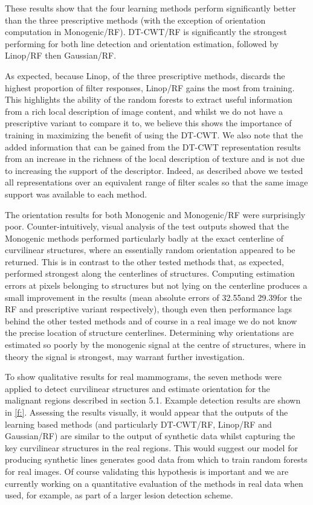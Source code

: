 These results show that the four learning methods perform significantly better than the three prescriptive methods (with the exception of orientation computation in Monogenic/RF). DT-CWT/RF is significantly the strongest performing for both line detection and orientation estimation, followed by Linop/RF then Gaussian/RF.

As expected, because Linop, of the three prescriptive methods, discards the highest proportion of filter responses, Linop/RF gains the most from training. This highlights the ability of the random forests to extract useful information from a rich local description of image content, and whilst we do not have a prescriptive variant to compare it to, we believe this shows the importance of training in maximizing the benefit of using the DT-CWT. We also note that the added information that can be gained from the DT-CWT representation results from an increase in the richness of the local description of texture and is not due to increasing the support of the descriptor. Indeed, as described above we tested all representations over an equivalent range of filter scales so that the same image support was available to each method.

The orientation results for both Monogenic and Monogenic/RF were surprisingly poor. Counter-intuitively, visual analysis of the test outputs showed that the Monogenic methods performed particularly badly at the exact centerline of curvilinear structures, where an essentially random orientation appeared to be returned. This is in contrast to the other tested methods that, as expected, performed strongest along the centerlines of structures. Computing estimation errors at pixels belonging to structures but not lying on the centerline produces a small improvement in the results (mean absolute errors of 32.55\deg and 29.39\deg for the RF and prescriptive variant respectively), though even then performance lags behind the other tested methods and of course in a real image we do not know the precise location of structure centerlines. Determining why orientations are estimated so poorly by the monogenic signal at the centre of structures, where in theory the signal is strongest, may warrant further investigation.

To show qualitative results for real mammograms, the seven methods were applied to detect curvilinear structures and estimate orientation for the malignant regions described in section 5.1. Example detection results are shown in \ref{f:}. Assessing the results visually, it would appear that the outputs of the learning based methods (and particularly DT-CWT/RF, Linop/RF and Gaussian/RF) are similar to the output of synthetic data whilst capturing the key curvilinear structures in the real regions. This would suggest our model for producing synthetic lines generates good data from which to train random forests for real images. Of course validating this hypothesis is important and we are currently working on a quantitative evaluation of the methods in real data when used, for example, as part of a larger lesion detection scheme.

